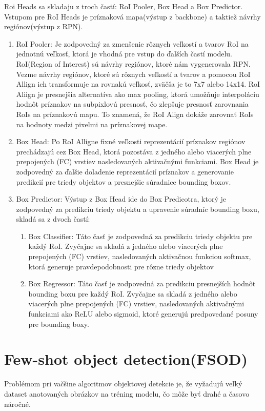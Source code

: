 Roi Heads sa skladaju z troch častí: RoI Pooler, Box Head a Box Predictor. Vstupom pre RoI Heads je príznaková mapa(výstup z backbone) a taktiež návrhy regiónov(výstup z RPN).
\begin{enumerate}
  \item RoI Pooler: Je zodpovedný za zmenšenie rôznych veľkostí a tvarov RoI na jednotnú veľkosť, ktorá je vhodná pre vstup do ďalších častí modelu. RoI(Region of Interest) sú návrhy regiónov, ktoré nám vygenerovala RPN. Vezme návrhy regiónov, ktoré sú rôznych veľkostí a tvarov a pomocou RoI Allign ich transformuje na rovnakú veľkosť, zväčša je to 7x7 alebo 14x14. RoI Aliign je presnejšia alternatíva ako max pooling, ktorá umožňuje interpoláciu hodnôt príznakov na subpixlovú presnosť, čo zlepšuje presnosť zarovnania RoIs na príznakovú mapu. To znamená, že RoI Align dokáže zarovnať RoIs na hodnoty medzi pixelmi na príznakovej mape.
  \item Box Head: Po RoI Alligne fixné veľkosti reprezentácií príznakov regiónov prechádzajú cez Box Head, ktorá pozostáva z jedného alebo viacerých plne prepojených (FC) vrstiev nasledovaných aktivačnými funkciami. Box Head je zodpovedný za ďalšie doladenie reprezentácií príznakov a generovanie predikcií pre triedy objektov a presnejšie súradnice bounding boxov.
  \item Box Predictor: Výstup z Box Head ide do Box Predicotra, ktorý je zodpovedný za predikciu triedy objektu a upravenie súradníc bounding boxu, skladá sa z dvoch častí: 
  \begin{enumerate}
  \item Box Classifier: Táto časť je zodpovedná za predikciu triedy objektu pre každý RoI. Zvyčajne sa skladá z jedného alebo viacerých plne prepojených (FC) vrstiev, nasledovaných aktivačnou funkciou softmax, ktorá generuje pravdepodobnosti pre rôzne triedy objektov
  \item Box Regressor: Táto časť je zodpovedná za predikciu presnejších hodnôt bounding boxu pre každý RoI. Zvyčajne sa skladá z jedného alebo viacerých plne prepojených (FC) vrstiev, nasledovaných aktivačnými funkciami ako ReLU alebo sigmoid, ktoré generujú predpovedané posuny pre bounding boxy.
  \end{enumerate}
\end{enumerate}
 
\section{Few-shot object detection(FSOD)}
\hspace{\parindent}Problémom pri vačšine algoritmov objektovej detekcie je, že vyžadujú veľký dataset anotovaných obrázkov na tréning modelu, čo môže byť drahé a časovo náročné. 

